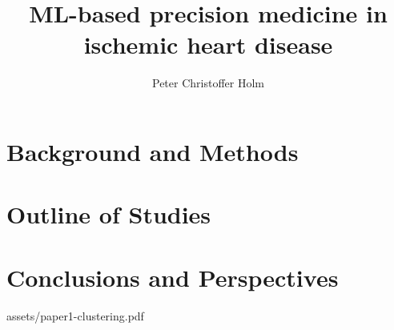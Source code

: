 \documentclass[a4paper, twoside, nobib]{tufte-book}
\title{ML-based precision medicine in ischemic heart disease}
\author[Peter Christoffer Holm]{Peter Christoffer Holm}
\begin{document}

\frontmatter
\maketitle

  

        
        

\cleardoublepage

\tableofcontents
\listoffigures
\listoftables

      

\cleardoublepage
   

\mainmatter %

\part{Background and Methods}

\part{Outline of Studies}
 
 
 

\part{Conclusions and Perspectives}


\backmatter %

\printbibliography

\mainmatter %

\appendix
\appendixpage
\addappheadtotoc
\cleardoublepage

%
    {assets/paper1-clustering.pdf}
\end{document}
